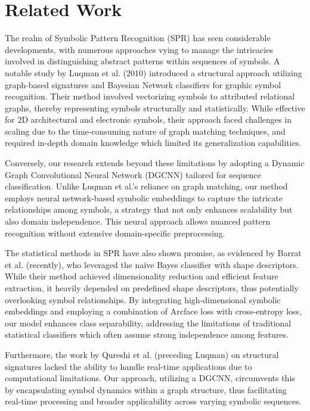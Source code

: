 \documentclass{article}
\begin{document}
\section{Related Work}
The realm of Symbolic Pattern Recognition (SPR) has seen considerable developments, with numerous approaches vying to manage the intricacies involved in distinguishing abstract patterns within sequences of symbols. A notable study by Luqman et al. (2010) introduced a structural approach utilizing graph-based signatures and Bayesian Network classifiers for graphic symbol recognition. Their method involved vectorizing symbols to attributed relational graphs, thereby representing symbols structurally and statistically. While effective for 2D architectural and electronic symbols, their approach faced challenges in scaling due to the time-consuming nature of graph matching techniques, and required in-depth domain knowledge which limited its generalization capabilities.

Conversely, our research extends beyond these limitations by adopting a Dynamic Graph Convolutional Neural Network (DGCNN) tailored for sequence classification. Unlike Luqman et al.'s reliance on graph matching, our method employs neural network-based symbolic embeddings to capture the intricate relationships among symbols, a strategy that not only enhances scalability but also domain independence. This neural approach allows nuanced pattern recognition without extensive domain-specific preprocessing.

The statistical methods in SPR have also shown promise, as evidenced by Barrat et al. (recently), who leveraged the naïve Bayes classifier with shape descriptors. While their method achieved dimensionality reduction and efficient feature extraction, it heavily depended on predefined shape descriptors, thus potentially overlooking symbol relationships. By integrating high-dimensional symbolic embeddings and employing a combination of Arcface loss with cross-entropy loss, our model enhances class separability, addressing the limitations of traditional statistical classifiers which often assume strong independence among features.

Furthermore, the work by Qureshi et al. (preceding Luqman) on structural signatures lacked the ability to handle real-time applications due to computational limitations. Our approach, utilizing a DGCNN, circumvents this by encapsulating symbol dynamics within a graph structure, thus facilitating real-time processing and broader applicability across varying symbolic sequences.
\end{document}

